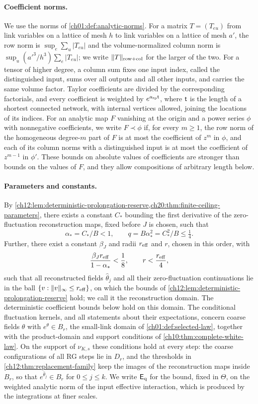 \paragraph{Coefficient norms.}
We use the norms of \cref{ch01:def:analytic-norms}. For a matrix $T=(T_{eu})$ from link variables on a lattice of mesh $h$ to link variables on a lattice of mesh $a'$, the row norm is $\sup_e\sum_u|T_{eu}|$ and the volume-normalized column norm is $\sup_u(a'^3/h^3)\sum_e|T_{eu}|$; we write $\|T\|_{\rm row+col}$ for the larger of the two. For a tensor of higher degree, a column sum fixes one input index, called the distinguished input, sums over all outputs and all other inputs, and carries the same volume factor. Taylor coefficients are divided by the corresponding factorials, and every coefficient is weighted by $e^{a_{\mathrm{sp}}\mathsf t}$, where $\mathsf t$ is the length of a shortest connected network, with internal vertices allowed, joining the locations of its indices. For an analytic map $F$ vanishing at the origin and a power series $\phi$ with nonnegative coefficients, we write $F\prec\phi$ if, for every $m\ge1$, the row norm of the homogeneous degree-$m$ part of $F$ is at most the coefficient of $z^m$ in $\phi$, and each of its column norms with a distinguished input is at most the coefficient of $z^{m-1}$ in $\phi'$. These bounds on absolute values of coefficients are stronger than bounds on the values of $F$, and they allow compositions of arbitrary length below.

\paragraph{Parameters and constants.}
By \cref{ch12:lem:deterministic-prolongation-reserve,ch20:thm:finite-ceiling-parameters}, there exists a constant $C_*$ bounding the first derivative of the zero-fluctuation reconstruction maps, fixed before $J$ is chosen, such that
\[
 \alpha_*=C_*/B<1,\qquad q=B\alpha_*^2=C_*^2/B\le\tfrac14.
\]
Further, there exist a constant $\beta_J$ and radii $r_{\rm eff}$ and $r$, chosen in this order, with
\[
 \frac{\beta_Jr_{\rm eff}}{1-\alpha_*}<\frac18,\qquad r<\frac{r_{\rm eff}}4,
\]
such that all reconstructed fields $\widehat\theta_j$ and all their zero-fluctuation continuations lie in the ball $\{v:\|v\|_\infty\le r_{\rm eff}\}$, on which the bounds of \cref{ch12:lem:deterministic-prolongation-reserve} hold; we call it the reconstruction domain. The deterministic coefficient bounds below hold on this domain. The conditional fluctuation kernels, and all statements about their expectations, concern coarse fields $\theta$ with $e^\theta\in B_r$, the small-link domain of \cref{ch01:def:selected-law}, together with the product-domain and support conditions of \cref{ch10:thm:complete-white-law}. On the support of $\nu_{K,s}$ these conditions hold at every step: the coarse configurations of all RG steps lie in $D_r$, and the thresholds in \cref{ch12:thm:replacement-family} keep the images of the reconstruction maps inside $B_r$, so that $e^{\widehat\theta_j}\in B_r$ for $0\le j\le k$. We write $\mathsf E_{\rm q}$ for the bound, fixed in $\Theta$, on the weighted analytic norm of the input effective interaction, which is produced by the integrations at finer scales.

